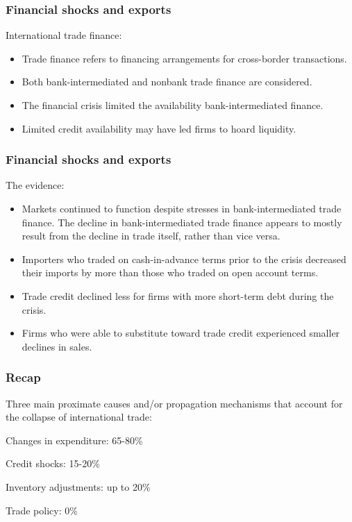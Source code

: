 \documentclass{beamer}
\newcommand{\cmark}{\ding{51}}%
\newcommand{\xmark}{\ding{55}}%
\begin{document}
\begin{frame}
  \frametitle{Financial shocks and exports}
  International trade finance:
  \begin{itemize}
  \item Trade finance refers to financing arrangements for cross-border
    transactions.
  \item Both bank-intermediated and nonbank trade finance are considered.
  \item The financial crisis limited the availability bank-intermediated
    finance.
  \item Limited credit availability may have led firms to hoard liquidity.
  \end{itemize}
\end{frame}

\begin{frame}
  \frametitle{Financial shocks and exports}
  The evidence:
  \begin{itemize}
  \item Markets continued to function despite stresses in bank-intermediated trade finance.
    The decline in bank-intermediated trade finance appears to mostly result from the decline in trade itself, rather than vice versa.
  \item Importers who traded on cash-in-advance terms prior to the crisis decreased their imports by more than those who traded on open account terms.
  \item Trade credit declined less for firms with more short-term debt during
    the crisis.
  \item Firms who were able to substitute toward trade credit experienced smaller declines in sales.
  \end{itemize}
\end{frame}

\begin{frame}
  \frametitle{Recap}
  \begin{itemize*}
  \item Three main proximate causes and/or propagation mechanisms that account for the collapse of international trade:
  \item \textcolor{green}{\cmark} Changes in expenditure: 65-80\%
  \item \textcolor{green}{\cmark} Credit shocks: 15-20\%
  \item \textcolor{green}{\cmark} Inventory adjustments: up to 20\%
  \item \textcolor{red}{\xmark} Trade policy: 0\%
  \end{itemize*}
\end{frame}
\end{document}
